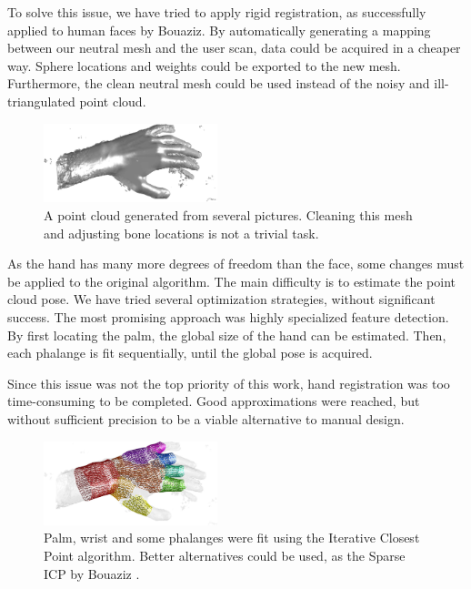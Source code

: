 \documentclass[a4paper,10pt]{article}
\begin{document}
\begin{multicols}{2}
To solve this issue, we have tried to apply rigid registration, as successfully applied to human faces by Bouaziz\cite{Bouaziz:2013:DRK:2504435.2504456}.
By automatically generating a mapping between our neutral mesh and the user scan, data could be acquired in a cheaper way.
Sphere locations and weights could be exported to the new mesh.
Furthermore, the clean neutral mesh could be used instead of the noisy and ill-triangulated point cloud.

\begin{figure}[H]
\centering
\includegraphics[width=0.45\textwidth]{figs/registration_cloud}
\caption{A point cloud generated from several pictures.
Cleaning this mesh and adjusting bone locations is not a trivial task.}
\end{figure}

As the hand has many more degrees of freedom than the face, some changes must be applied to the original algorithm.
The main difficulty is to estimate the point cloud pose.
We have tried several optimization strategies, without significant success.
The most promising approach was highly specialized feature detection.
By first locating the palm, the global size of the hand can be estimated.
Then, each phalange is fit sequentially, until the global pose is acquired.

Since this issue was not the top priority of this work, hand registration was too time-consuming to be completed.
Good approximations were reached, but without sufficient precision to be a viable alternative to manual design.

\begin{figure}[H]
\centering
\includegraphics[width=0.45\textwidth]{figs/registration_attempt}
\caption{Palm, wrist and some phalanges were fit using the Iterative Closest Point algorithm.
Better alternatives could be used, as the Sparse ICP by Bouaziz \cite{Bouaziz:2013:SIC:2600289.2600305}.}
\end{figure}



\end{multicols}
\end{document}
